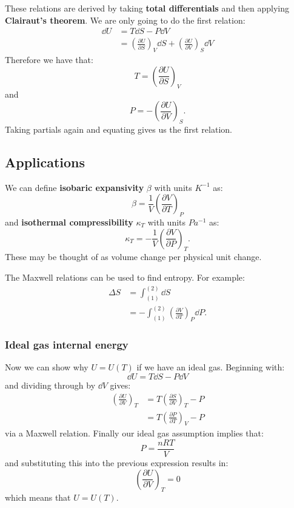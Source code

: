 \documentclass{article}
\begin{document}
These relations are derived by taking \textbf{total differentials} and then applying \textbf{Clairaut's theorem}. We are only going to do the first relation:    
\begin{align*}
    \dd U
    &= T\dd S-P\dd V\\
    &= \left(\frac{\partial U}{\partial S}\right)_V \dd S
    + \left(\frac{\partial U}{\partial V}\right)_S \dd V
\end{align*}
Therefore we have that:
$$T=\left(\frac{\partial U}{\partial S}\right)_V$$
and 
$$P=-\left(\frac{\partial U}{\partial V}\right)_S.$$
Taking partials again and equating gives us the first relation.

\newpage

\subsection{Applications}
We can define \textbf{isobaric expansivity} $\beta$ with units $K^{-1}$ as:
$$\beta=\frac{1}{V}
\left(\frac{\partial V}{\partial T}\right)_P$$
and \textbf{isothermal compressibility} $\kappa_T$ with units $Pa^{-1}$ as:
$$\kappa_T=-\frac{1}{V}
\left(\frac{\partial V}{\partial P}\right)_T.$$
These may be thought of as volume change per physical unit change.

The Maxwell relations can be used to find entropy. For example:
\begin{align*}
    \Delta S
    &=\int_{(1)}^{(2)}\dd S\\
    &=-\int_{(1)}^{(2)}\left(\frac{\partial V}{\partial T}\right)_P \dd P.
\end{align*}

\subsubsection{Ideal gas internal energy}
Now we can show why $U=U(T)$ if we have an ideal gas. Beginning with:
$$\dd U=T\dd S-P\dd V$$
and dividing through by $\dd V$ gives:
\begin{align*}
    \left(\frac{\partial U}{\partial V}\right)_T
    &=T\left(\frac{\partial S}{\partial V}\right)_T-P \\
    &=T\left(\frac{\partial P}{\partial T}\right)_V-P
\end{align*}
via a Maxwell relation.
Finally our ideal gas assumption implies that:
$$P=\frac{nRT}{V}$$
and substituting this into the previous expression results in:
$$\left(\frac{\partial U}{\partial V}\right)_T=0$$
which means that $U=U(T)$.
\end{document}
